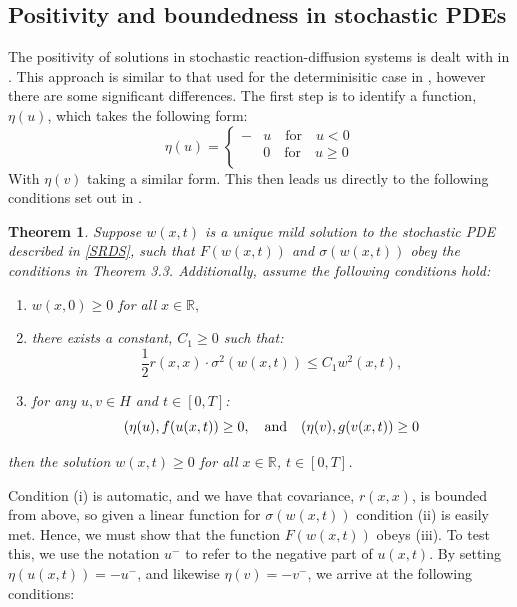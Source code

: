 \documentclass[12pt]{article}
\newtheorem{theorem}{Theorem}[section]
\begin{document}
\subsection{Positivity and boundedness in stochastic PDEs}
The positivity of solutions in stochastic reaction-diffusion systems is dealt with in \cite{Chow}. This approach is similar to that used for the determinisitic case in , however there are some significant differences. The first step is to identify a function, $\eta(u)$, which takes the following form:
\begin{equation}
 \eta(u) =  \left\{
\begin{array}{ll}
      -&u \quad \text{for}\quad u<0 \\
      &0 \quad\text{for}\quad u \geq 0 \\
\end{array} 
\right.
\end{equation}
With $\eta(v)$ taking a similar form. This then leads us directly to the following conditions set out in \cite{Chow}. 
\begin{theorem}\cite{Chow}
Suppose $w(x,t)$ is a unique mild solution to the stochastic PDE described in \eqref{SRDS}, such that $F(w(x,t))$ and $\sigma(w(x,t))$ obey the conditions in Theorem 3.3. Additionally, assume the following conditions hold:
\begin{enumerate}
    \item [(i)] $w(x,0) \geq 0$ for all $x\in\mathbb{R},$
    \item [(ii)] there exists a constant, $C_1 \geq 0$ such that:
    $$\frac{1}{2}r(x,x)\cdot\sigma^2(w(x,t)) \leq C_1w^2(x,t),$$
    \item [(iii)] for any $u,v \in H$ and $t \in [0,T]$:
    \begin{equation*}
    (\eta(u),f(u(x,t)) \geq 0\\, \quad \text{and} \quad (\eta(v),g(v(x,t)) \geq 0
    \end{equation*}
\end{enumerate}
then the solution $w(x,t) \geq 0$ for all $x\in\mathbb{R}$, $t\in[0,T]$.
\end{theorem}

Condition (i) is automatic, and we have that covariance, $r(x,x)$, is bounded from above, so given a linear function for $\sigma(w(x,t))$ condition (ii) is easily met. Hence, we must show that the function $F(w(x,t))$ obeys (iii). To test this, we use the notation $u^-$ to refer to the negative part of $u(x,t)$. By setting $\eta(u(x,t)) = -u^-$, and likewise $\eta(v) = -v^-$, we arrive at the following conditions:
\end{document}
